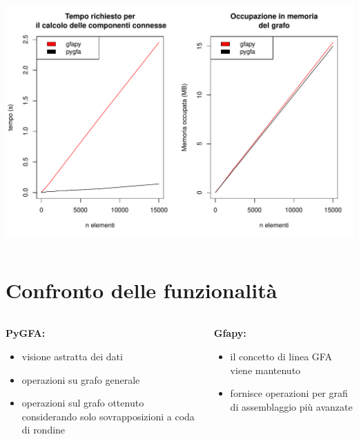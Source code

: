 \documentclass{beamer}
\begin{document}
\begin{frame}{\secname}
\begin{columns}
\begin{column}{0.5\textwidth}
			\centering
			\includegraphics[height=0.45\textheight, width=\textwidth, keepaspectratio]{comparison}
		\end{column}
	\end{columns}
\end{frame}



\section{Confronto delle funzionalità}
\begin{frame}{\secname}
	\begin{columns}[T]
		\begin{column}{0.5\textwidth}
			\textbf{PyGFA:}
			\begin{itemize}
				\item visione astratta dei dati
				\item operazioni su grafo generale
				\item operazioni sul grafo ottenuto considerando
					solo sovrapposizioni a coda di rondine
			\end{itemize}
		\end{column}
		\begin{column}{0.5\textwidth}
			\textbf{Gfapy:}
			\begin{itemize}
				\item il concetto di linea GFA viene mantenuto
				\item fornisce operazioni per grafi di assemblaggio più avanzate
			\end{itemize}
		\end{column}
	\end{columns}
\end{frame}
\end{document}
